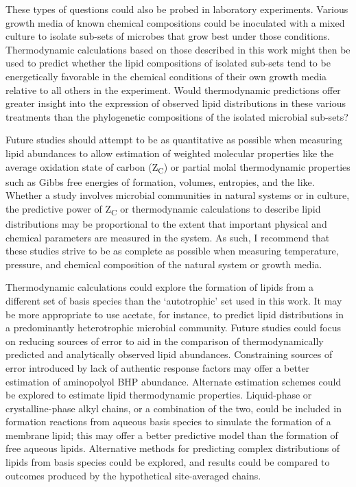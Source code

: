 These types of questions could also be probed in laboratory experiments. Various growth media of known chemical compositions could be inoculated with a mixed culture to isolate sub-sets of microbes that grow best under those conditions. Thermodynamic calculations based on those described in this work might then be used to predict whether the lipid compositions of isolated sub-sets tend to be energetically favorable in the chemical conditions of their own growth media relative to all others in the experiment. Would thermodynamic predictions offer greater insight into the expression of observed lipid distributions in these various treatments than the phylogenetic compositions of the isolated microbial sub-sets?

Future studies should attempt to be as quantitative as possible when measuring lipid abundances to allow estimation of weighted molecular properties like the average oxidation state of carbon (Z\textsubscript{C}) or partial molal thermodynamic properties such as Gibbs free energies of formation, volumes, entropies, and the like. Whether a study involves microbial communities in natural systems or in culture, the predictive power of Z\textsubscript{C} or thermodynamic calculations to describe lipid distributions may be proportional to the extent that important physical and chemical parameters are measured in the system. As such, I recommend that these studies strive to be as complete as possible when measuring temperature, pressure, and chemical composition of the natural system or growth media.

Thermodynamic calculations could explore the formation of lipids from a different set of basis species than the `autotrophic' set used in this work. It may be more appropriate to use acetate, for instance, to predict lipid distributions in a predominantly heterotrophic microbial community. Future studies could focus on reducing sources of error to aid in the comparison of thermodynamically predicted and analytically observed lipid abundances. Constraining sources of error introduced by lack of authentic response factors may offer a better estimation of aminopolyol BHP abundance. Alternate estimation schemes could be explored to estimate lipid thermodynamic properties. Liquid-phase or crystalline-phase alkyl chains, or a combination of the two, could be included in formation reactions from aqueous basis species to simulate the formation of a membrane lipid; this may offer a better predictive model than the formation of free aqueous lipids. Alternative methods for predicting complex distributions of lipids from basis species could be explored, and results could be compared to outcomes produced by the hypothetical site-averaged chains.


